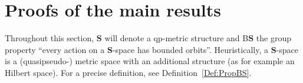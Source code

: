 \documentclass[a4paper]{article}
\theoremstyle{definition}
\newcommand*{\BS}{B$\mathbf{S}$}
\begin{document}
%
%
%
%
%
%
%
%
\section{Proofs of the main results}
\label{Section:Proof}
%
%
%
Throughout this section, $\mathbf{S}$ will denote a qp-metric structure and \BS{} the group property ``every action on a $\mathbf{S}$-space has bounded orbits''.
Heuristically, a $\mathbf{S}$-space is a (quasipseudo-) metric space with an additional structure (as for example an Hilbert space). For a precise definition, see Definition~\ref{Def:PropBS}.
\end{document}
